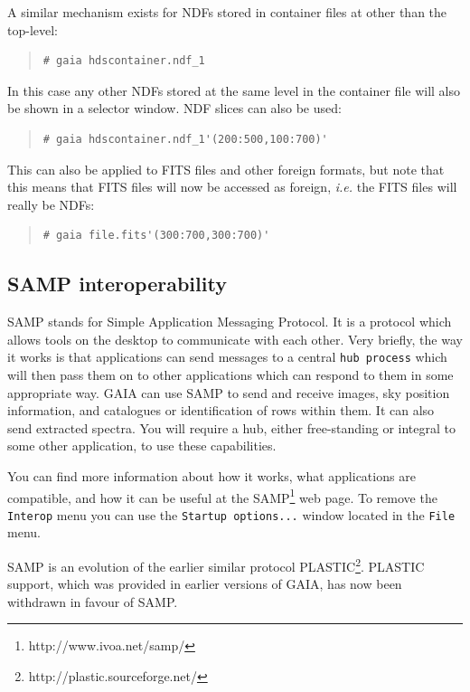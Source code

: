 \documentclass[twoside,11pt]{article}
\newcommand{\htmladdnormallinkfoot}[2]{#1\footnote{#2}}
\renewcommand{\_}{\texttt{\symbol{95}}}
\newcommand{\mytt}[1]{{\texttt{#1}}}
\begin{document}
A similar mechanism exists for NDFs stored in container files at other
than the top-level:
\begin{quote}
\begin{verbatim}
# gaia hdscontainer.ndf_1
\end{verbatim}
\end{quote}
In this case any other NDFs stored at the same level in the container
file will also be shown in a selector window. NDF slices can also be
used:
\begin{quote}
\begin{verbatim}
# gaia hdscontainer.ndf_1'(200:500,100:700)'
\end{verbatim}
\end{quote}
This can also be applied to FITS files and other foreign formats, but
note that this means that FITS files will now be accessed as foreign,
\textit{i.e.} the FITS files will really be NDFs:
\begin{quote}
\begin{verbatim}
# gaia file.fits'(300:700,300:700)'
\end{verbatim}
\end{quote}

\subsection{SAMP interoperability}

SAMP stands for Simple Application Messaging Protocol. It is
a protocol which allows tools on the desktop to communicate with each other.
Very briefly, the way it works is that applications can send messages to a
central \mytt{hub process} which will then pass them on to other applications
which can respond to them in some appropriate way.
GAIA can use SAMP to send and receive images, sky position information,
and catalogues or identification of rows within them.  It can also
send extracted spectra.  You will require a hub, either free-standing or
integral to some other application, to use these capabilities.

You can find more information about how it works, what applications
are compatible, and how it can be useful at the
\htmladdnormallinkfoot{SAMP}{http://www.ivoa.net/samp/} web page.
To remove the \mytt{Interop} menu you can use the
\mytt{Startup options...} window located in the \mytt{File} menu.

SAMP is an evolution of the earlier similar protocol
\htmladdnormallinkfoot{PLASTIC}{http://plastic.sourceforge.net/}.
PLASTIC support, which was provided in earlier versions of GAIA,
has now been withdrawn in favour of SAMP.
\end{document}
